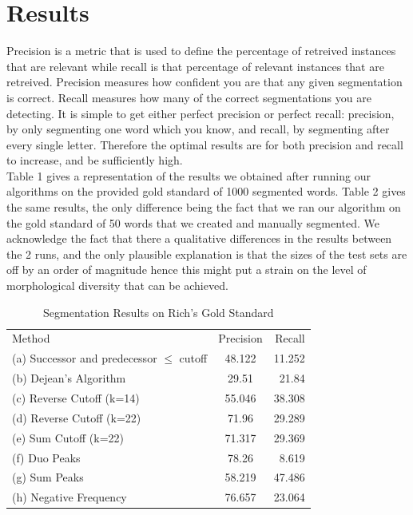 \documentclass[11pt]{article}
\begin{document}
\section{Results}
Precision is a metric that is used to define the percentage of retreived 
instances that are relevant while recall is that percentage of relevant 
instances that are retreived. Precision measures
how confident you are that any given segmentation is correct. Recall measures
how many of the correct segmentations you are detecting. It is simple to get
either perfect precision or perfect recall: precision, by only segmenting one
word which you know, and recall, by segmenting after every single letter.
Therefore the optimal results are for both precision and recall to increase,
and be sufficiently high.\\
Table 1 gives a representation of the results we obtained after running our
algorithms on the provided gold standard of 1000 segmented words. Table 2 gives
the same results, the only difference being the fact that we ran our 
algorithm on the gold standard of 50 words that we created and manually 
segmented. We acknowledge the fact that there a qualitative differences in
the results between the 2 runs, and the only plausible explanation is that
the sizes of the test sets are off by an order of magnitude hence this might
put a strain on the level of morphological diversity that can be achieved.\\
\begin{table}
\centering
\begin{tabular}{ l  c || r }
  Method & Precision & Recall \\
    (a) Successor and predecessor $\leq$ cutoff & 48.122 & 11.252\\
    (b) Dejean's Algorithm & 29.51 & 21.84\\
    (c) Reverse Cutoff (k=14) & 55.046 & 38.308\\
    (d) Reverse Cutoff (k=22) & 71.96 & 29.289 \\
    (e) Sum Cutoff (k=22) & 71.317 & 29.369 \\
    (f) Duo Peaks         & 78.26 & 8.619 \\
    (g) Sum Peaks         & 58.219 & 47.486 \\
    (h) Negative Frequency &76.657 & 23.064 \\
\end{tabular}
\caption{Segmentation Results on Rich's Gold Standard}
\label{tab:table1}
\end{table}
\end{document}
